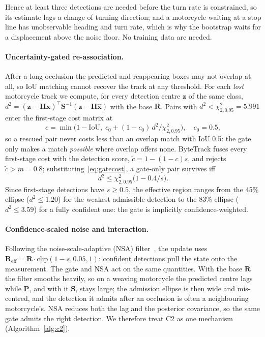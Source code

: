 \documentclass[twocolumn]{svjour3}
\begin{document}
Hence at least three detections are needed before the turn rate is constrained,
so its estimate lags a change of turning direction; and a motorcycle waiting at a
stop line has unobservable heading and turn rate, which is why the bootstrap
waits for a displacement above the noise floor. No training data are needed.

\paragraph{Uncertainty-gated re-association.}
After a long occlusion the predicted and reappearing boxes may not overlap at
all, so IoU matching cannot recover the track at any threshold. For each
\emph{lost} motorcycle track we compute, for every detection centre $\mathbf{z}$
of the same class, $d^{2}=(\mathbf{z}-\mathbf{H}\hat{\mathbf{x}})^{\top}\mathbf{S}^{-1}(\mathbf{z}-\mathbf{H}\hat{\mathbf{x}})$
with the base $\mathbf{R}$. Pairs with $d^{2}<\chi^{2}_{2,0.95}=5.991$ enter the
first-stage cost matrix at
\begin{equation}
c=\min\bigl(1-\mathrm{IoU},\;c_0+(1-c_0)\,d^{2}/\chi^{2}_{2,0.95}\bigr),\quad c_0=0.5,\label{eq:gatecost}
\end{equation}
so a rescued pair never costs less than an overlap match with IoU 0.5: the gate
only makes a match \emph{possible} where overlap offers none. ByteTrack fuses
every first-stage cost with the detection score, $\tilde c=1-(1-c)s$, and rejects
$\tilde c>m=0.8$; substituting~\eqref{eq:gatecost}, a gate-only pair survives iff
\begin{equation}
d^{2}\le\chi^{2}_{2,0.95}\bigl(1-0.4/s\bigr).\label{eq:admission}
\end{equation}
Since first-stage detections have $s\ge0.5$, the effective region ranges from
the 45\% ellipse ($d^{2}\le1.20$) for the weakest admissible detection to the
83\% ellipse ($d^{2}\le3.59$) for a fully confident one: the gate is implicitly
confidence-weighted.

\paragraph{Confidence-scaled noise and interaction.}
Following the noise-scale-adaptive (NSA) filter~\cite{Du2021_giaotracker,Du2023_strongsort},
the update uses $\mathbf{R}_{\mathrm{eff}}=\mathbf{R}\cdot\mathrm{clip}(1-s,0.05,1)$:
confident detections pull the state onto the measurement. The gate and NSA act
on the same quantities. With the base $\mathbf{R}$ the filter smooths heavily, so
on a weaving motorcycle the predicted centre lags while $\mathbf{P}$, and with it
$\mathbf{S}$, stays large; the admission ellipse is then wide and mis-centred,
and the detection it admits after an occlusion is often a neighbouring
motorcycle's. NSA reduces both the lag and the posterior covariance, so the same
gate admits the right detection. We therefore treat C2 as one mechanism
(Algorithm~\ref{alg:c2}).
\end{document}

